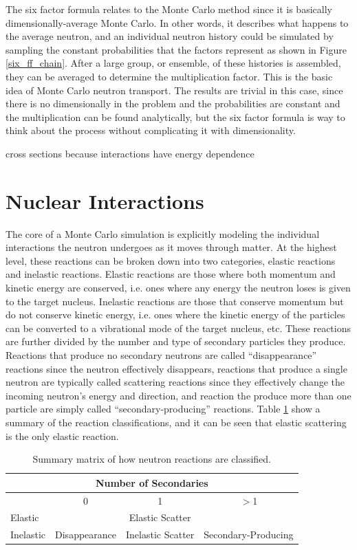 The six factor formula relates to the Monte Carlo method since it is basically dimensionally-average Monte Carlo.  In other words, it describes what happens to the average neutron, and an individual neutron history could be simulated by sampling the constant probabilities that the factors represent as shown in Figure \ref{six_ff_chain}.  After a large group, or ensemble, of these histories is assembled, they can be averaged to determine the multiplication factor.  This is the basic idea of Monte Carlo neutron transport.  The results are trivial in this case, since there is no dimensionally in the problem and the probabilities are constant and the multiplication can be found analytically, but the six factor formula is way to think about the process without complicating it with dimensionality.

cross sections because interactions have energy dependence

\section{Nuclear Interactions}
\label{subsec:interactions}

The core of a Monte Carlo simulation is explicitly modeling the individual interactions the neutron undergoes as it moves through matter.  At the highest level, these reactions can be broken down into two categories, elastic reactions and inelastic reactions.  Elastic reactions are those where both momentum and kinetic energy are conserved, i.e. ones where any energy the neutron loses is given to the target nucleus.  Inelastic reactions are those that conserve momentum but do not conserve kinetic energy, i.e. ones where the kinetic energy of the particles can be converted to a vibrational mode of the target nucleus, etc.  These reactions are further divided by the number and type of secondary particles they produce.  Reactions that produce no secondary neutrons are called ``disappearance'' reactions since the neutron effectively disappears, reactions that produce a single neutron are typically called scattering reactions since they effectively change the incoming neutron's energy and direction, and reaction the produce more than one particle are simply called ``secondary-producing'' reactions. Table \ref{nuc_reaction_summary} show a summary of the reaction classifications, and it can be seen that elastic scattering is the only elastic reaction.   

\begin{table}[h]
\centering
\caption{Summary matrix of how neutron reactions are classified.}
\label{nuc_reaction_summary}
\begin{tabular}{| l | c | c | c |}
\multicolumn{4}{c}{Number of Secondaries} \\
\hline
  & 0 & 1 & $>$1 \\
 \hline
 Elastic & & Elastic Scatter & \\
 \hline
 Inelastic & Disappearance & Inelastic Scatter & Secondary-Producing \\
\hline
\end{tabular}
\end{table}

